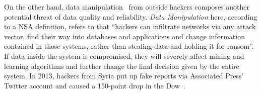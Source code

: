 \documentclass[a4paper]{IEEEtran}
\begin{document}
		On the other hand, data manipulation~\autocite{dataManipulation} from outside hackers composes another potential threat of data quality and reliability. \textit{Data Manipulation} here, according to a NSA definition, refers to that ``hackers can infiltrate networks via any attack vector, find their way into databases and applications and change information contained in those systems, rather than stealing data and holding it for ransom''.
		If data inside the system is compromised, they will severely affect mining and learning algorithms and further change the final decision given by the entire system. In 2013, hackers from Syria put up fake reports via Associated Press' Twitter account and caused a 150-point drop in the Dow~\cite{SyriaHacker}.
		
		
\end{document}
